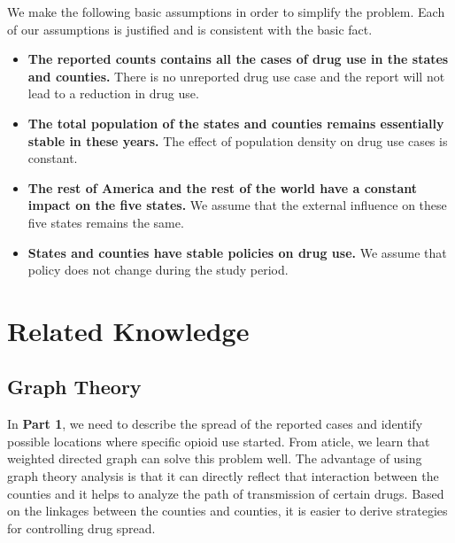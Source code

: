\documentclass{mcmthesis}
\begin{document}
We make the following basic assumptions in order to simplify the problem. Each
of our assumptions is justified and is consistent with the basic fact.
\begin{itemize}
	\item \textbf{The reported counts contains all the cases of drug use in the states and counties.} There is no unreported drug use case and the report will not lead to a reduction in drug use.
	\item \textbf{The total population of the states and counties remains essentially stable in these years.} The effect of population density on drug use cases is constant.
	\item \textbf{The rest of America and the rest of the world have a constant impact on the five states.} We assume that the external influence on these five states remains the same.
	\item \textbf{States and counties have stable policies on drug use.} We assume that policy does not change during the study period.
\end{itemize}

\section{Related Knowledge}

\subsection*{Graph Theory}
In \textbf{Part 1}, we need to describe the spread of the reported cases and identify possible locations where specific opioid use started. From aticle\cite{2}, we learn that weighted directed graph can solve this problem well. The advantage of using graph theory analysis is that it can directly reflect that interaction between the counties and it helps to analyze the path of transmission of certain drugs. Based on the linkages between the counties and counties, it is easier to derive strategies for controlling drug spread.
\end{document}
